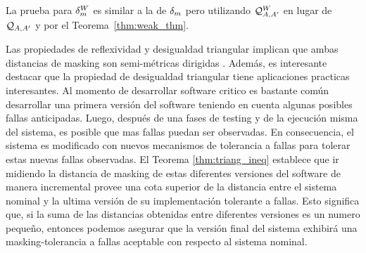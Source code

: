 La prueba para $\delta_{m}^W$ es similar a la de $\delta_{m}$ 
pero utilizando $\mathcal{Q}^W_{A,A'}$ en lugar de $\mathcal{Q}_{A, A'}$ y por el Teorema~\ref{thm:weak_thm}.

Las propiedades de reflexividad y desigualdad triangular implican que ambas distancias de masking son semi-métricas dirigidas \cite{CharikarMM06,AlfaroMRS08}. Además, es interesante destacar que la propiedad de desigualdad triangular tiene aplicaciones practicas interesantes. Al momento de desarrollar software critico es bastante común desarrollar una primera versión del software teniendo en cuenta algunas posibles fallas anticipadas. 
Luego, después de una fases de testing y de la ejecución misma del sistema, es posible que mas fallas puedan ser observadas. En consecuencia, el sistema es modificado con nuevos mecanismos de tolerancia a fallas para tolerar estas nuevas fallas observadas. 
El Teorema \ref{thm:triang_ineq} establece que ir midiendo la distancia de masking de estas diferentes versiones del software de manera incremental provee una cota superior de la distancia entre el sistema nominal y la ultima versión de su implementación tolerante a fallas. Esto significa que, si la suma de las distancias obtenidas entre diferentes versiones es un numero pequeño, entonces podemos asegurar que la versión final del sistema exhibirá una masking-tolerancia a fallas aceptable con respecto al sistema nominal.